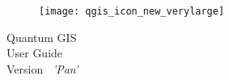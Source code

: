 
\begin{titlepage}
\begin{center}

\begin{figure}[H]
\begin{center}
\texttt{[image: qgis\_icon\_new\_verylarge]} 
\end{center}
\end{figure}

\Huge{Quantum GIS}\\
\vspace{0.5cm}
\Large{User Guide} \\
\vspace{0.5cm}
\Large{Version ~\CURRENT \textsl{'Pan'}}

\end{center}
\end{titlepage}
